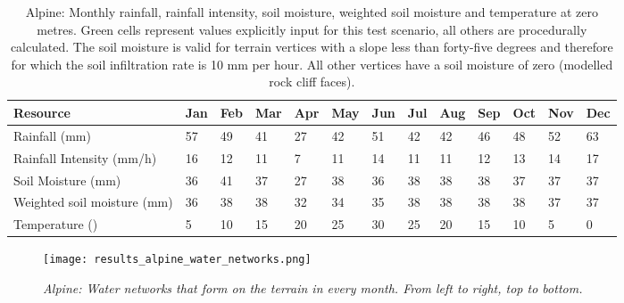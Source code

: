 \begin{table}[htb!]
  \centering
	    \begin{tabular}{|p{3cm}|p{.7cm}|p{.7cm}|p{.7cm}|p{.7cm}|p{.7cm}|p{.7cm}|p{.7cm}|p{.7cm}|p{.7cm}|p{.7cm}|p{.7cm}|p{.7cm}|}
		\hline	
  	    \textbf{Resource} & \textbf{Jan} & \textbf{Feb} & \textbf{Mar} & \textbf{Apr} & \textbf{May} & \textbf{Jun} & \textbf{Jul} & \textbf{Aug} & \textbf{Sep} & \textbf{Oct} & \textbf{Nov} & \textbf{Dec} \\
  	    \hline	
		Rainfall (mm) & \cellcolor{green}57 & \cellcolor{green}49 & \cellcolor{green}41 & \cellcolor{green}27 & \cellcolor{green}42 & \cellcolor{green}51 & \cellcolor{green}42 & \cellcolor{green}42 & \cellcolor{green}46 & \cellcolor{green}48 & \cellcolor{green}52 & \cellcolor{green}63  \\
		\hline
		Rainfall Intensity (mm/h) & \cellcolor{green}16 & \cellcolor{green}12 & \cellcolor{green}11 & \cellcolor{green}7 & \cellcolor{green}11 & \cellcolor{green}14 & \cellcolor{green}11 & \cellcolor{green}11 & \cellcolor{green}12 & \cellcolor{green}13 & \cellcolor{green}14 & \cellcolor{green}17  \\
		\hline
		Soil Moisture (mm) & 36 & 41 & 37 & 27 & 38 & 36 & 38 & 38 & 38 & 37 & 37 & 37  \\
		\hline
		Weighted soil moisture (mm)	& 36 & 38	& 38 & 32 & 34 & 35 & 38 & 38 & 38 & 38 & 37 & 37 \\
		\hline
		Temperature (\textdegree) & 5 & 10 & 15 & 20 & 25 & \cellcolor{green}30 & 25 & 20 & 15 & 10 & 5 & \cellcolor{green}0  \\
		\hline
		\end{tabular}
		\caption{Alpine: Monthly rainfall, rainfall intensity, soil moisture, weighted soil moisture and temperature at zero metres. Green cells represent values explicitly input for this test scenario, all others are procedurally calculated. The soil moisture is valid for terrain vertices with a slope less than forty-five degrees and therefore for which the soil infiltration rate is 10 mm per hour. All other vertices have a soil moisture of zero (modelled rock cliff faces).}
	  \label{tab:results_alpine_input_resources}
\end{table}

\begin{figure}[htb!]
\center
	\texttt{[image: results\_alpine\_water\_networks.png]}
	\caption{\textit{Alpine: Water networks that form on the terrain in every month. From left to right, top to bottom.}}
	\label{fig:results_alpine_water_networks}
\end{figure}


